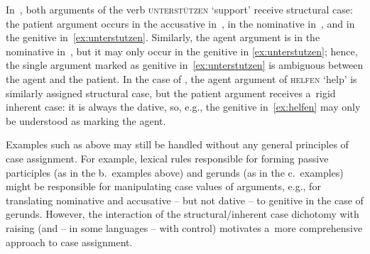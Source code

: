 \documentclass[output=paper]{langsci/langscibook}
\begin{document}
In~, both arguments of the verb \textsc{unterst\"utzen} ‘support’ receive structural case: the patient argument occurs in the accusative in~, in the nominative in~, and in the genitive in~\cref{ex:unterstutzen}.  Similarly, the agent argument is in the nominative in~, but it may only occur in the genitive in \cref{ex:unterstutzen}; hence, the single argument marked as genitive in~\cref{ex:unterstutzen} is ambiguous between the agent and the patient.  In the case of , the agent argument of \textsc{helfen} ‘help’ is similarly assigned structural case, but the patient argument receives a~rigid inherent case: it is always the dative, so, e.g., the genitive in~\cref{ex:helfen} may only be understood as marking the agent.

Examples such as above may still be handled without any general principles of case assignment.  For example, lexical rules \citep[209–218]{ps} responsible for forming passive participles (as in the b.~examples above) and gerunds (as in the c.~examples) might be responsible for manipulating case values of arguments, e.g., for translating nominative and accusative – but not dative – to genitive in the case of gerunds.  However, the interaction of the structural/inherent case dichotomy with raising (and – in some languages – with control) motivates a~more comprehensive approach to case assignment.
\end{document}
